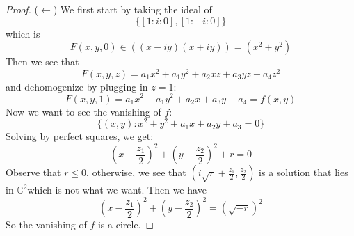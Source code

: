 \documentclass{article}
\begin{document}
\begin{proof}
        ($\leftarrow$) We first start by taking the ideal of 
            \begin{equation*}
                \{[1 : i : 0], [1 : -i : 0]\}
            \end{equation*}
        which is 
            \begin{equation*}
                F(x, y, 0) \in ((x - iy)(x + iy)) = (x^{2} + y^{2})
            \end{equation*}
        Then we see that 
            \begin{equation*}
                F(x, y, z) = a_{1}x^{2} + a_{1}y^{2} + a_{2}xz + a_{3}yz + a_{4}z^{2}
            \end{equation*}
        and dehomogenize by plugging in $z = 1$:
            \begin{equation*}
                F(x, y, 1) = a_{1}x^{2} + a_{1}y^{2} + a_{2}x + a_{3}y + a_{4} = f(x, y)
            \end{equation*}
        Now we want to see the vanishing of $f$:
            \begin{equation*}
                \{(x, y): x^{2} + y^{2} + a_{1}x + a_{2}y + a_{3} = 0\}
            \end{equation*}
        Solving by perfect squares, we get:
            \begin{equation*}
                \left(x - \dfrac{z_{1}}{2}\right)^{2} + \left(y - \dfrac{z_{2}}{2}\right)^{2} + r = 0
            \end{equation*}
        Observe that $r \leq 0$, otherwise, we see that $(i\sqrt{r} + \frac{z_{1}}{2}, \frac{z_{2}}{2})$ is a solution that lies in $\mathbb{C}^{2}$which is not what we want. Then we have
            \begin{equation*}
                \left(x - \dfrac{z_{1}}{2}\right)^{2} + \left(y - \dfrac{z_{2}}{2}\right)^{2} = (\sqrt{-r})^{2}
            \end{equation*}
        So the vanishing of $f$ is a circle.
    \end{proof}
\end{document}
